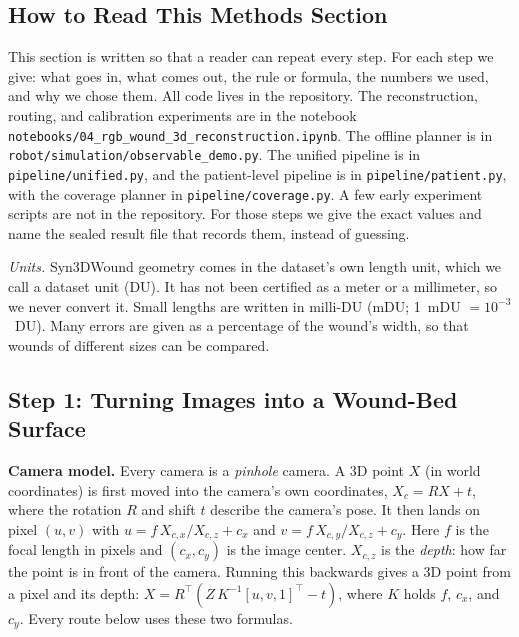 \documentclass[conference]{IEEEtran}
\begin{document}
\subsection{How to Read This Methods Section}

This section is written so that a reader can repeat every step. For each
step we give: what goes in, what comes out, the rule or formula, the
numbers we used, and why we chose them. All code lives in the repository.
The reconstruction, routing, and calibration experiments are in the
notebook \texttt{notebooks/04\_rgb\_wound\_3d\_reconstruction.ipynb}. The
offline planner is in \texttt{robot/simulation/observable\_demo.py}. The
unified pipeline is in \texttt{pipeline/unified.py}, and the patient-level
pipeline is in \texttt{pipeline/patient.py}, with the coverage planner in
\texttt{pipeline/coverage.py}. A few early experiment scripts are not in the
repository. For those steps we give the exact values and name the sealed
result file that records them, instead of guessing.

\emph{Units.} Syn3DWound geometry comes in the dataset's own length unit,
which we call a dataset unit (DU). It has not been certified as a meter or a
millimeter, so we never convert it. Small lengths are written in milli-DU
(mDU; 1~mDU $=10^{-3}$~DU). Many errors are given as a percentage of the
wound's width, so that wounds of different sizes can be compared.

\subsection{Step 1: Turning Images into a Wound-Bed Surface}

\textbf{Camera model.} Every camera is a \emph{pinhole} camera. A 3D point
$X$ (in world coordinates) is first moved into the camera's own coordinates,
$X_c = RX + t$, where the rotation $R$ and shift $t$ describe the camera's
pose. It then lands on pixel $(u,v)$ with
$u = f\,X_{c,x}/X_{c,z} + c_x$ and $v = f\,X_{c,y}/X_{c,z} + c_y$. Here
$f$ is the focal length in pixels and $(c_x,c_y)$ is the image center.
$X_{c,z}$ is the \emph{depth}: how far the point is in front of the camera.
Running this backwards gives a 3D point from a pixel and its depth:
$X = R^{\top}(Z\,K^{-1}[u,v,1]^{\top} - t)$, where $K$ holds $f$, $c_x$, and
$c_y$. Every route below uses these two formulas.
\end{document}
